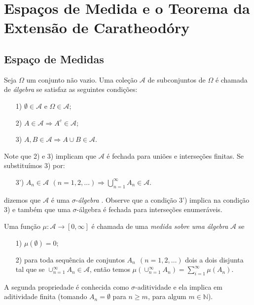 \chapter[Aula 2]{Espaços de Medida e o Teorema da Extensão de Caratheodóry}
\chaptermark{}
\section{Espaço de Medidas}


Seja $\Omega$ um conjunto não vazio.
Uma coleção $\mathcal{A}$ de subconjuntos de $\Omega$ é chamada de
 {\it álgebra} se satisfaz as seguintes condições:
\begin{itemize}
	\item[1)] $\emptyset\in\mathcal{A}$ e $\Omega\in\mathcal{A}$;
	\item[2)] $A\in \mathcal{A} \Rightarrow A^c\in\mathcal{A}$;
	\item[3)] $A,B\in \mathcal{A} \Rightarrow A\cup B\in\mathcal{A}$.
\end{itemize}
Note que 2) e 3) implicam que $\mathcal{A}$ é fechada para uniões 
e interseções finitas. Se substituímos 3) por:
\begin{itemize}
	\item[3')] $A_n\in\mathcal{A}\ \, (n=1,2,\ldots) 
				\Rightarrow 
				\displaystyle\bigcup_{n=1}^{\infty} A_n \in \mathcal{A}$.
\end{itemize}
dizemos que $\mathcal{A}$ é uma $\sigma$-{\it álgebra}  . Observe que a condição 3') 
implica na condição 3) e também que uma $\sigma$-álgebra é fechada para
interseções enumeráveis.

\begin{definicao}[Medida]
Uma função $\mu:\mathcal{A}\to [0,\infty]$ é chamada de uma {\it medida sobre uma álgebra} 
$\mathcal{A}$ se 
\begin{itemize}
	\item[1)] $\mu(\emptyset)=0$;
	\item[2)] para toda sequência de conjuntos $A_n \ \ (n=1,2,\ldots)$ dois a dois disjunta
				tal que se $\cup_{n=1}^{\infty}A_n \in \mathcal{A}$, então temos
			 $\mu(\cup_{n=1}^{\infty} A_n ) =\sum_{i=1}^{\infty}\mu(A_n)$.
\end{itemize}
\end{definicao}
A segunda propriedade é conhecida como $\sigma$-aditividade e ela implica 
em aditividade finita (tomando $A_n=\emptyset$ para $n\geq m$, para algum $m\in\mathbb{N}$).


